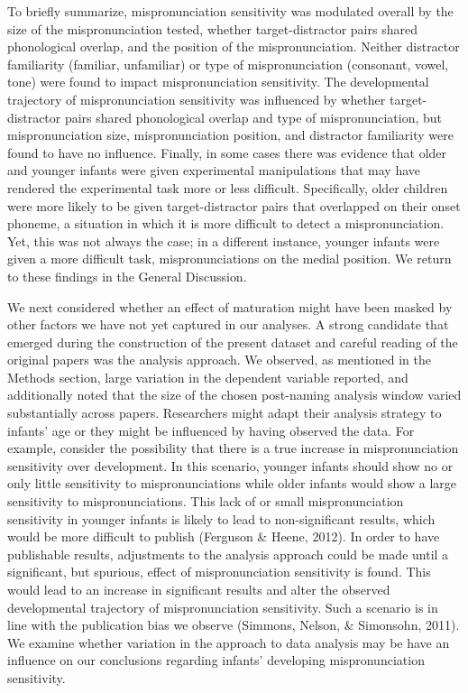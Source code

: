 \documentclass[man]{apa6}
\begin{document}
To briefly summarize, mispronunciation sensitivity was modulated overall by the size of the mispronunciation tested, whether target-distractor pairs shared phonological overlap, and the position of the mispronunciation. Neither distractor familiarity (familiar, unfamiliar) or type of mispronunciation (consonant, vowel, tone) were found to impact mispronunciation sensitivity. The developmental trajectory of mispronunciation sensitivity was influenced by whether target-distractor pairs shared phonological overlap and type of mispronunciation, but mispronunciation size, mispronunciation position, and distractor familiarity were found to have no influence. Finally, in some cases there was evidence that older and younger infants were given experimental manipulations that may have rendered the experimental task more or less difficult. Specifically, older children were more likely to be given target-distractor pairs that overlapped on their onset phoneme, a situation in which it is more difficult to detect a mispronunciation. Yet, this was not always the case; in a different instance, younger infants were given a more difficult task, mispronunciations on the medial position. We return to these findings in the General Discussion.

We next considered whether an effect of maturation might have been masked by other factors we have not yet captured in our analyses. A strong candidate that emerged during the construction of the present dataset and careful reading of the original papers was the analysis approach. We observed, as mentioned in the Methods section, large variation in the dependent variable reported, and additionally noted that the size of the chosen post-naming analysis window varied substantially across papers. Researchers might adapt their analysis strategy to infants' age or they might be influenced by having observed the data. For example, consider the possibility that there is a true increase in mispronunciation sensitivity over development. In this scenario, younger infants should show no or only little sensitivity to mispronunciations while older infants would show a large sensitivity to mispronunciations. This lack of or small mispronunciation sensitivity in younger infants is likely to lead to non-significant results, which would be more difficult to publish (Ferguson \& Heene, 2012). In order to have publishable results, adjustments to the analysis approach could be made until a significant, but spurious, effect of mispronunciation sensitivity is found. This would lead to an increase in significant results and alter the observed developmental trajectory of mispronunciation sensitivity. Such a scenario is in line with the publication bias we observe (Simmons, Nelson, \& Simonsohn, 2011). We examine whether variation in the approach to data analysis may be have an influence on our conclusions regarding infants' developing mispronunciation sensitivity.
\end{document}
